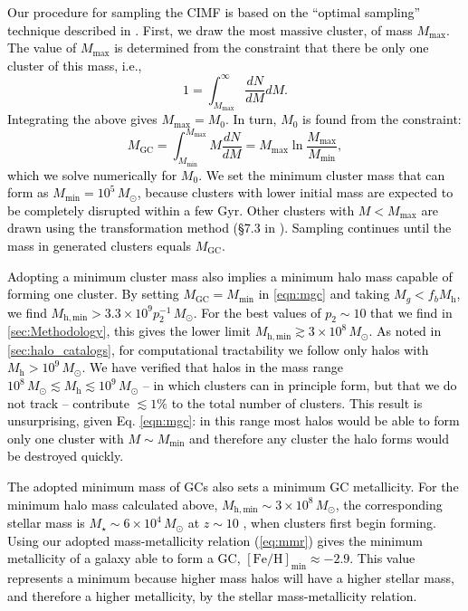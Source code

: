 \documentclass[fleqn,usenatbib]{mnras}
\newcommand{\rev}[1]{\textcolor{black}{#1}}
\newcommand{\Mh}{M_{\mathrm{h}}}
\newcommand{\Msun}{\,M_{\odot}}
\newcommand{\Mgc}{M_{\mathrm{GC}}}
\newcommand{\Mstar}{M_{\star}}
\newcommand{\feh}{\mathrm{[Fe/H]}}
\begin{document}
\rev{Our procedure for sampling the CIMF is based on the ``optimal sampling'' technique described in \cite{schulz_etal_2015}. First, we draw the most massive cluster, of mass $M_{\mathrm{max}}$. The value of $M_{\mathrm{max}}$ is determined from the constraint that there be only one cluster of this mass, i.e.,
\begin{equation}
  1 = \int_{M_{\mathrm{max}}}^{\infty} \frac{dN}{dM} dM.
\end{equation}
Integrating the above gives $M_{\mathrm{max}} = M_0$. In turn, $M_0$ is found from the constraint:
\begin{equation}
  \Mgc = \int_{M_{\mathrm{min}}}^{M_{\mathrm{max}}} M\frac{dN}{dM} = M_{\mathrm{max}}\ln\frac{M_{\mathrm{max}}}{M_{\mathrm{min}}},
\end{equation}
which we solve numerically for $M_0$. We set the minimum cluster mass that can form as $M_{\mathrm{min}} = 10^5\Msun$, because clusters with lower initial mass are expected to be completely disrupted within a few Gyr. Other clusters with $M < M_{\mathrm{max}}$ are drawn using the transformation method (\S7.3 in \citealt{numerical_recipes}). Sampling continues until the mass in generated clusters equals $\Mgc$.}

\rev{Adopting a minimum cluster mass also implies a minimum halo mass capable of forming one cluster. By setting $\Mgc = M_{\mathrm{min}}$ in \autoref{eqn:mgc} and taking $M_g < f_b\Mh$, we find $M_\mathrm{h,min} > 3.3\times 10^{9} p_2^{-1}\Msun$. For the best values of $p_2 \sim 10$ that we find in \autoref{sec:Methodology}, this gives the lower limit $M_\mathrm{h,min} \gtrsim 3\times 10^8 \Msun$. As noted in \autoref{sec:halo_catalogs}, for computational tractability we follow only halos with $\Mh > 10^9\Msun$. We have verified that halos in the mass range $10^8 \Msun \lesssim \Mh \lesssim 10^9 \Msun$ -- in which clusters can in principle form, but that we do not track -- contribute $\lesssim 1\%$ to the total number of clusters. This result is unsurprising, given Eq. \ref{eqn:mgc}: in this range most halos would be able to form only one cluster with $M \sim M_{\mathrm{min}}$ and therefore any cluster the halo forms would be destroyed quickly.}

\rev{The adopted minimum mass of GCs also sets a minimum GC metallicity. For the minimum halo mass calculated above, $M_{\mathrm{h,min}} \sim 3 \times 10^8 \Msun$, the corresponding stellar mass is $\Mstar \sim 6 \times 10^4 \Msun$  at $z \sim 10$  \citep{behroozi_etal_2013_main}, when clusters first begin forming. Using our adopted mass-metallicity relation (\autoref{eq:mmr}) gives the minimum metallicity of a galaxy able to form a GC, $\feh_{\mathrm{min}} \approx -2.9$. This value represents a minimum because higher mass halos will have a higher stellar mass, and therefore a higher metallicity, by the stellar mass-metallicity relation.}
\end{document}

